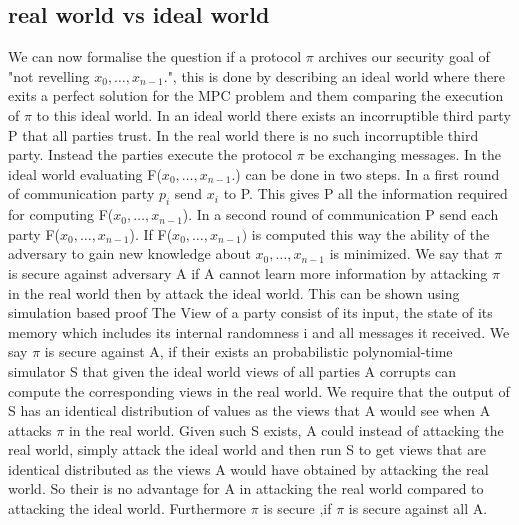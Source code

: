 \subsection{real world vs ideal world }
We can now formalise the question if a protocol $ \pi $ archives our security goal of "not revelling $ x_0,\dots,x_{n-1}. $", this is done by describing an ideal world where there exits a perfect solution for the MPC problem and them comparing the execution of $ \pi $ to this ideal world. In an ideal world there exists an incorruptible third party P that all parties trust. In the real world there is no such incorruptible third party. Instead the parties execute the protocol $ \pi $ be exchanging messages.
In the ideal world evaluating F($ x_0,\dots,x_{n-1}. $) can be done in two steps. In a first round of communication party $ p_i $ send $x_i $ to P.
This gives P all the information required for computing F($ x_0,\dots,x_{n-1} $). In a second round of communication P send each party F($ x_0,\dots,x_{n-1} $).
If F($ x_0,\dots,x_{n-1}) $ is computed this way the ability of the adversary to gain new knowledge about $ x_0,\dots,x_{n-1} $ is minimized. We say that  $ \pi $ is secure against adversary A if A cannot learn more information by attacking $ \pi $ in the real world then by attack the ideal world. This can be shown using simulation based proof 
The View of a party consist of its input, the state of its memory which includes its internal randomness i and all messages it received. 
We say $ \pi $ is secure against A,  if their exists an probabilistic polynomial-time simulator S that given the ideal world views of all parties A corrupts can compute the corresponding views in the real world. We require that the output of S has an identical distribution of values as the views that A would see when A attacks $ \pi $ in the real world. Given such S exists, A could instead of attacking the real world, simply attack the ideal world and then run S to get views that are identical distributed as the views A would have obtained by attacking the real world. So their is no advantage for A in attacking the real world compared to attacking the ideal world. Furthermore $ \pi $ is secure ,if $ \pi $ is secure against all A.       
      

